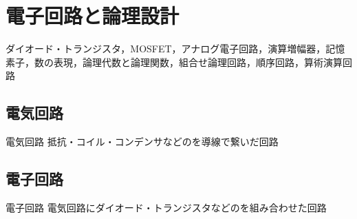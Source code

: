 \chapter{電子回路と論理設計}
ダイオード・トランジスタ，MOSFET，アナログ電子回路，演算増幅器，記憶素子，数の表現，論理代数と論理関数，組合せ論理回路，順序回路，算術演算回路

\section{電気回路}

\begin{defbox}{電気回路}
    抵抗・コイル・コンデンサなどのを導線で繋いだ回路
\end{defbox}

\section{電子回路}

\begin{defbox}{電子回路}
    電気回路にダイオード・トランジスタなどのを組み合わせた回路
\end{defbox}
